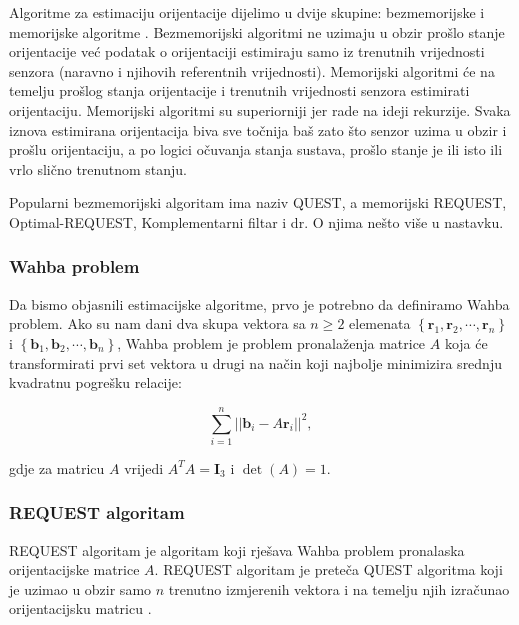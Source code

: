 \documentclass[times, utf8, diplomski, numeric]{templates/template}
\begin{document}
{{{            Algoritme za estimaciju orijentacije dijelimo u dvije skupine: bezmemorijske i memorijske algoritme \cite{uvod_u_svemirske}. Bezmemorijski algoritmi ne uzimaju u obzir prošlo stanje orijentacije već podatak o orijentaciji estimiraju samo iz trenutnih vrijednosti senzora (naravno i njihovih referentnih vrijednosti). Memorijski algoritmi će na temelju prošlog stanja orijentacije i trenutnih vrijednosti senzora estimirati orijentaciju. Memorijski algoritmi su superiorniji jer rade na ideji rekurzije. Svaka iznova estimirana orijentacija biva sve točnija baš zato što senzor uzima u obzir i prošlu orijentaciju, a po logici očuvanja stanja sustava, prošlo stanje je ili isto ili vrlo slično trenutnom stanju. 

            Popularni bezmemorijski algoritam ima naziv QUEST, a memorijski REQUEST, Optimal-REQUEST, Komplementarni filtar i dr. O njima nešto više u nastavku. 

            \subsubsection{Wahba problem}{
                Da bismo objasnili estimacijske algoritme, prvo je potrebno da definiramo Wahba problem. Ako su nam dani dva skupa vektora sa $n\ge2$ elemenata $\left\{ \boldsymbol{r}_1, \boldsymbol{r}_2, \cdots , \boldsymbol{r}_n \right\}$ i $\left\{ \boldsymbol{b}_1, \boldsymbol{b}_2, \cdots , \boldsymbol{b}_n \right\}$, Wahba problem je problem pronalaženja matrice $A$ koja će transformirati prvi set vektora u drugi na način koji najbolje minimizira srednju kvadratnu pogrešku relacije:

                \begin{equation}
                    \sum_{i=1}^{n}||\boldsymbol{b}_i - A\boldsymbol{r}_i||^2,
                \end{equation}

                gdje za matricu $A$ vrijedi $A^T A = \boldsymbol{I}_3$ i $\det(A)=1.$
            }

            \subsubsection{REQUEST algoritam}{
                REQUEST algoritam je algoritam koji rješava Wahba problem pronalaska orijentacijske matrice $A$. REQUEST algoritam je preteča QUEST algoritma koji je uzimao u obzir samo $n$ trenutno izmjerenih vektora i na temelju njih izračunao orijentacijsku matricu \cite{quest_algo}. 

}}}}
\end{document}
